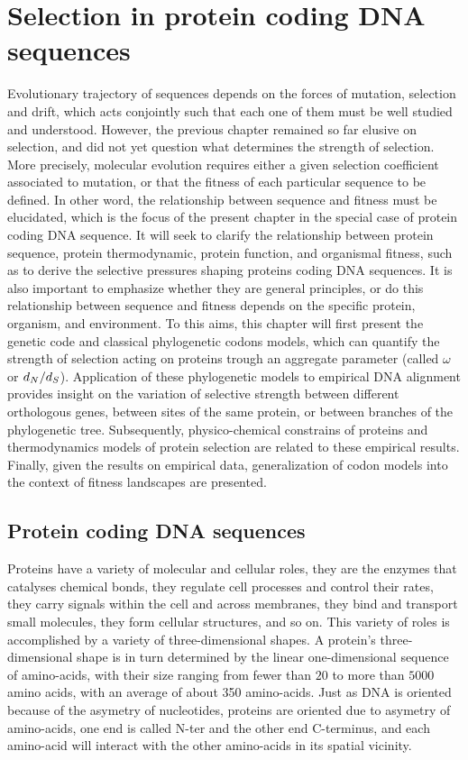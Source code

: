 \chapter{Selection in protein coding {DNA} sequences}
{
	\hypersetup{linkcolor=GREYDARK}
	\minitoc
}
\label{sec:selection}
Evolutionary trajectory of sequences depends on the forces of mutation, selection and drift, which acts conjointly such that each one of them must be well studied and understood.
However, the previous chapter remained so far elusive on selection, and did not yet question what determines the strength of selection.
More precisely, molecular evolution requires either a given selection coefficient associated to mutation, or that the fitness of each particular sequence to be defined.
In other word, the relationship between sequence and fitness must be elucidated, which is the focus of the present chapter in the special case of protein coding \acrshort{DNA} sequence.
It will seek to clarify the relationship between protein sequence, protein thermodynamic, protein function, and organismal fitness, such as to derive the selective pressures shaping proteins coding \acrshort{DNA} sequences.
It is also important to emphasize whether they are general principles, or do this relationship between sequence and fitness depends on the specific protein, organism, and environment.
To this aims, this chapter will first present the genetic code and classical phylogenetic \glspl{codon} models, which can quantify the strength of selection acting on proteins trough an aggregate parameter (called $\omega$ or $d_N / d_S$).
Application of these phylogenetic models to empirical \acrshort{DNA} alignment provides insight on the variation of selective strength between different orthologous genes, between sites of the same protein, or between branches of the phylogenetic tree.
Subsequently, physico-chemical constrains of proteins and thermodynamics models of protein selection are related to these empirical results.
Finally, given the results on empirical data, generalization of \gls{codon} models into the context of fitness landscapes are presented.

\section{Protein coding \acrshort{DNA} sequences}

Proteins have a variety of molecular and cellular roles, they are the enzymes that catalyses chemical bonds, they regulate cell processes and control their rates, they carry signals within the cell and across membranes, they bind and transport small molecules, they form cellular structures, and so on.
This variety of roles is accomplished by a variety of three-dimensional shapes.
A protein's three-dimensional shape is in turn determined by the linear one-dimensional sequence of amino-acids, with their size ranging from fewer than $20$ to more than $5000$ amino acids, with an average of about 350 amino-acids.
Just as \acrshort{DNA} is oriented because of the asymetry of nucleotides, proteins are oriented due to asymetry of amino-acids, one end is called \gls{N-ter} and the other end C-terminus, and each amino-acid will interact with the other amino-acids in its spatial vicinity. 

